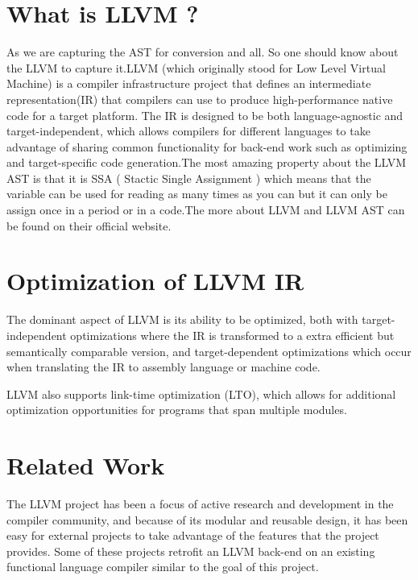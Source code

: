 \documentclass[openany]{book}
\begin{document}
	\section{What is LLVM ?}
	As we are capturing the AST for conversion and all. So one should know about the LLVM to capture it.LLVM (which originally stood for Low Level Virtual Machine) is a compiler infrastructure project that defines an intermediate representation(IR) that compilers can use to produce high-performance native code for a target platform. The IR is designed to be both language-agnostic and target-independent, which allows compilers for different languages to take advantage of sharing common functionality for back-end work such as optimizing and target-specific code generation.\newline \newline The most amazing property about the LLVM AST is that it is SSA ( Stactic Single Assignment ) which means that the variable can be used for reading as many times as you can but it can only be assign once in a period or in a code.\newline \newline The more about LLVM and LLVM AST can be found on their official website. \newpage
	

	\section{Optimization of LLVM IR}
	 The dominant aspect of LLVM is its ability to be optimized, both with target-independent optimizations  where  the  IR  is  transformed  to  a  extra  efficient  but  semantically  comparable version, and target-dependent optimizations which occur when translating the IR to assembly language or machine code.\newline
	 
	 LLVM also supports link-time optimization (LTO),  which allows for additional optimization opportunities for programs that span multiple modules.
	 
	\section{Related Work}
	The LLVM project has been a focus of active research and development in the compiler	community, and because of its modular and reusable design, it has been easy for external
	projects to take advantage of the features that the project provides. Some of these projects retrofit an LLVM back-end on an existing functional language compiler similar to the goal
	of this project.
	
\end{document}
